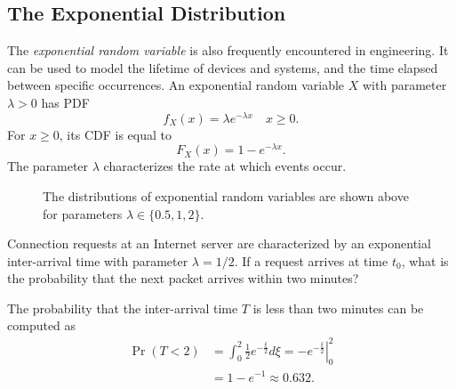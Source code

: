 \subsection{The Exponential Distribution}
\label{section:ExponentialDistribution}

The \emph{exponential random variable} is also frequently encountered in engineering. 
It can be used to model the lifetime of devices and systems, and the time elapsed between specific occurrences.
An exponential random variable $X$ with parameter $\lambda > 0$ has PDF
\begin{equation*}
f_X (x) = \lambda e^{- \lambda x} \quad x \geq 0 .
\end{equation*}
For $x \geq 0$, its CDF is equal to
\begin{equation*}
F_X (x) = 1 - e^{- \lambda x} .
\end{equation*}
The parameter $\lambda$ characterizes the rate at  which events occur.

\begin{figure}[ht]
\begin{center}
\end{center}
\caption{The distributions of exponential random variables are shown above for parameters $\lambda \in \{0.5, 1, 2 \}$.}
\end{figure}

\begin{example}
Connection requests at an Internet server are characterized by an exponential inter-arrival time with parameter $\lambda = 1/2$.
If a request arrives at time $t_0$, what is the probability that the next packet arrives within two minutes?

The probability that the inter-arrival time $T$ is less than two minutes can be computed as
\begin{equation*}
\begin{split}
\Pr ( T < 2 ) &= \int_0^2 \frac{1}{2} e^{- \frac{\xi}{2}} d\xi
= \left. - e^{- \frac{\xi}{2}} \right|_0^2 \\
&= 1 - e^{-1} \approx 0.632 .
\end{split}
\end{equation*}
\end{example}

